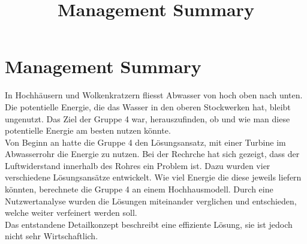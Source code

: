 \documentclass[12pt]{article}
\title{Management Summary}
\begin{document}
\section*{Management Summary}
In Hochhäusern und Wolkenkratzern fliesst Abwasser von hoch oben nach unten. Die potentielle Energie, die das Wasser in den oberen Stockwerken hat, bleibt ungenutzt. Das Ziel der Gruppe 4 war, herauszufinden, ob und wie man diese potentielle Energie am besten nutzen könnte.\\


Von Beginn an hatte die Gruppe 4 den Lösungsansatz, mit einer Turbine im Abwasserrohr die Energie zu nutzen. Bei der Rechrche hat sich gezeigt, dass der Luftwiderstand innerhalb des Rohres ein Problem ist. Dazu wurden vier verschiedene Lösungsansätze entwickelt. Wie viel Energie die diese jeweils liefern könnten, berechnete die Gruppe 4 an einem Hochhausmodell. Durch eine Nutzwertanalyse wurden die Lösungen miteinander verglichen und entschieden, welche weiter verfeinert werden soll.\\


Das entstandene Detailkonzept beschreibt eine effiziente Lösung, sie ist jedoch nicht sehr Wirtschaftlich. 

\end{document}
